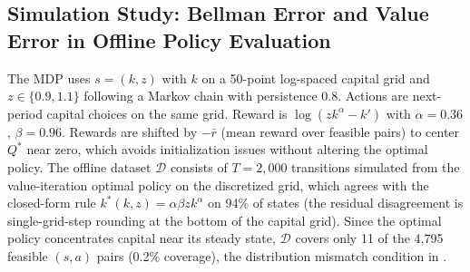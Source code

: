 \subsection{Simulation Study: Bellman Error and Value Error in Offline Policy Evaluation}
\label{sec:bellman_sim}

The MDP uses $s = (k, z)$ with $k$ on a 50-point log-spaced capital grid and $z \in \{0.9, 1.1\}$ following a Markov chain with persistence 0.8. Actions are next-period capital choices on the same grid. Reward is $\log(zk^\alpha - k')$ with $\alpha = 0.36$, $\beta = 0.96$. Rewards are shifted by $-\bar{r}$ (mean reward over feasible pairs) to center $Q^*$ near zero, which avoids initialization issues without altering the optimal policy. The offline dataset $\mathcal{D}$ consists of $T = 2{,}000$ transitions simulated from the value-iteration optimal policy on the discretized grid, which agrees with the closed-form rule $k^*(k,z) = \alpha\beta z k^\alpha$ on 94\% of states (the residual disagreement is single-grid-step rounding at the bottom of the capital grid). Since the optimal policy concentrates capital near its steady state, $\mathcal{D}$ covers only 11 of the 4,795 feasible $(s,a)$ pairs (0.2\% coverage), the distribution mismatch condition in \citet[Corollary~1]{Fujimoto2022}.

